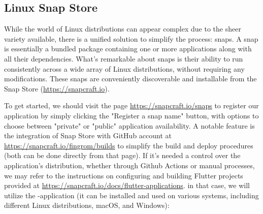 

\subsection{Linux Snap Store}

While the world of Linux distributions can appear complex due to the sheer variety available, there is a unified 
solution to simplify the process: snaps. A snap is essentially a bundled package containing one or more applications 
along with all their dependencies. What's remarkable about snaps is their ability to run consistently across a wide 
array of Linux distributions, without requiring any modifications. These snaps are conveniently discoverable and 
installable from the Snap Store (\href{https://snapcraft.io}{https://snapcraft.io}).

To get started, we should visit the page \href{https://snapcraft.io/snaps}{https://snapcraft.io/snaps} to register 
our application by simply clicking the "Register a snap name" button, with options to choose between "private" or 
"public" application availability. A notable feature is the integration of Snap Store with GitHub account at 
\href{https://snapcraft.io/fingrom/builds}{https://snapcraft.io/fingrom/builds} to simplify the build and deploy 
procedures (both can be done directly from that page). If it's needed a control over the application's distribution, 
whether through Github Actions or manual processes, we may refer to the instructions on configuring and building 
Flutter projects provided at 
\href{https://snapcraft.io/docs/flutter-applications}{https://snapcraft.io/docs/flutter-applications}.
in that case, we will utilize the -application (it can be installed and used on various systems, including 
different Linux distributions, macOS, and Windows):

